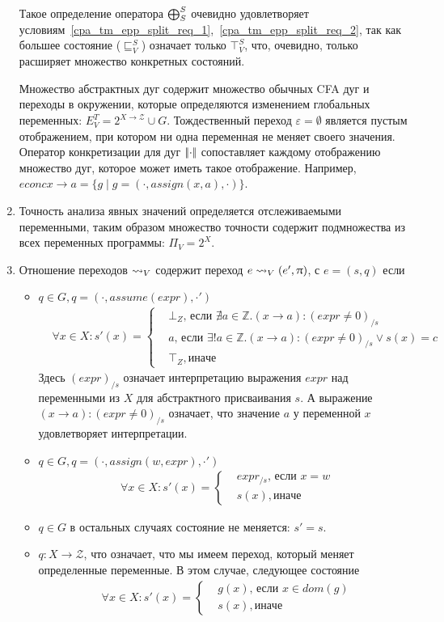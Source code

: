 \begin{enumerate}
Такое определение оператора $\mathrel{\bigoplus}^S_{S}$ очевидно удовлетворяет условиям~\ref{cpa_tm_epp_split_req_1},~\ref{cpa_tm_epp_split_req_2}, так как большее состояние ($\sqsubseteq^S_V$) означает только $\top^S_V$, что, очевидно, только расширяет множество конкретных состояний.

Множество абстрактных дуг содержит множество обычных CFA дуг и переходы в окружении, которые определяются изменением глобальных переменных:
$E^T_V = 2^{X \to \mathcal{Z}} \cup G$.
Тождественный переход $\varepsilon = \emptyset$ является пустым отображением, при котором ни одна переменная не меняет своего значения.
Оператор конкретизации для дуг $\lvert \! \lvert \cdot \rvert \! \rvert$ сопоставляет каждому отображению множество дуг, которое может иметь такое отображение.
Например, $econc{x \to a} = \{g \mid g = (\cdot, assign(x, a), \cdot)\}$.

\item Точность анализа явных значений определяется отслеживаемыми переменными, таким образом множество точности содержит подмножества из всех переменных программы:  $\Pi_V = 2^X$.

\item Отношение переходов $\leadsto_V$ содержит переход $e \leadsto_V (e', \uppi)$, с $e=(s,q)$ если 
\begin{itemize}
\item $q \in G, q=(\cdot,assume(expr),\cdot')$ 
\begin{align*}
&\forall x \in X: s'(x) = 
\begin{cases}
& \bot_Z \mbox{, если } \nexists a \in \mathbb{Z}. (x \rightarrow a) : (expr\neq 0)_{/s} \\
& a \mbox{, если } \exists !a \in \mathbb{Z}. (x \rightarrow a) : (expr\neq 0)_{/s} \lor s(x) = c \\
& \top_Z{, иначе }
\end{cases}
\end{align*}
Здесь $(expr)_{/s}$ означает интерпретацию выражения $expr$ над переменными из $X$ для абстрактного присваивания $s$.
А выражение $(x \rightarrow a) : (expr\neq 0)_{/s}$ означает, что значение $a$ у переменной $x$ удовлетворяет интерпретации.
\item $q \in G, q=(\cdot,assign(w, expr),\cdot')$ 
\begin{align*}
&\forall x \in X: s'(x) = 
\begin{cases}
& expr_{/s} \mbox{, если } x = w \\
& s(x){, иначе }
\end{cases}
\end{align*}
\item $q \in G$ в остальных случаях состояние не меняется: $s' = s$. 
\item $q: X \to \mathcal{Z}$, что означает, что мы имеем переход, который меняет определенные переменные.
В этом случае, следующее состояние
\begin{align*}
&\forall x \in X: s'(x) = 
\begin{cases}
& g(x) \mbox{, если } x \in dom(g) \\
& s(x){, иначе }
\end{cases}
\end{align*}
\end{itemize}


\end{enumerate}
